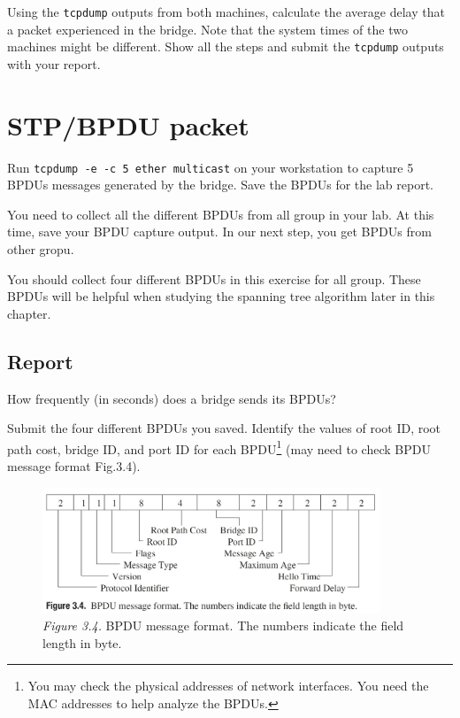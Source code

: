 \documentclass{../UTNetLab}
\begin{document}
    Using the \lstinline{tcpdump} outputs from both machines, calculate the average delay that a packet experienced in the bridge.
    Note that the system times of the two machines might be different.
    Show all the steps and submit the \lstinline{tcpdump} outputs with your report.


\section{STP/BPDU packet}
    Run \lstinline{tcpdump -e -c 5 ether multicast} on your workstation to capture 5 BPDUs messages generated by the bridge.
    Save the BPDUs for the lab report.

    You need to collect all the different BPDUs from all group in your lab.
    At this time, save your BPDU capture output. 
    In our next step,  you get BPDUs from other gropu.

    You should collect four different BPDUs in this exercise for all group.
    These BPDUs will be helpful when studying the spanning tree algorithm later in this chapter.

    \subsection*{Report}
    How frequently (in seconds) does a bridge sends its BPDUs?

    Submit the four different BPDUs you saved.
    Identify the values of root ID, root path cost, bridge ID, and port ID for each BPDU\footnote{You may check the physical addresses of network interfaces. You need the MAC addresses to help analyze the BPDUs.} (may need to check BPDU message format Fig.3.4).

    \begin{figure}[H]
        \centering
        \includegraphics[width=0.9\textwidth]{img/figure3-4.jpg}
        \caption{\textit{Figure 3.4.} BPDU message format. The numbers indicate the field length in byte.}
    \end{figure}
\end{document}
